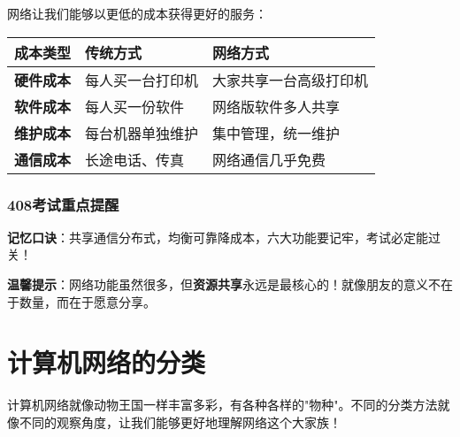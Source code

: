\documentclass[lang=cn,newtx,10pt,scheme=chinese]{../../elegantbook}
\begin{document}
网络让我们能够以更低的成本获得更好的服务：

\begin{longtable}{|p{4cm}|p{4cm}|p{5cm}|}
\hline
\textbf{成本类型} & \textbf{传统方式} & \textbf{网络方式} \\
\hline
\textbf{硬件成本} & 每人买一台打印机 & 大家共享一台高级打印机 \\
\hline
\textbf{软件成本} & 每人买一份软件 & 网络版软件多人共享 \\
\hline
\textbf{维护成本} & 每台机器单独维护 & 集中管理，统一维护 \\
\hline
\textbf{通信成本} & 长途电话、传真 & 网络通信几乎免费 \\
\hline
\end{longtable}

\subsubsection{408考试重点提醒}

\begin{center}
\end{center}

\textbf{记忆口诀}：共享通信分布式，均衡可靠降成本，六大功能要记牢，考试必定能过关！

\textbf{温馨提示}：网络功能虽然很多，但\textbf{资源共享}永远是最核心的！就像朋友的意义不在于数量，而在于愿意分享。

\section{计算机网络的分类}

计算机网络就像动物王国一样丰富多彩，有各种各样的"物种"。不同的分类方法就像不同的观察角度，让我们能够更好地理解网络这个大家族！
\end{document}
